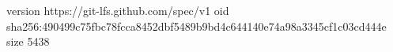 version https://git-lfs.github.com/spec/v1
oid sha256:490499c75fbc78fcca8452dbf5489b9bd4c644140e74a98a3345cf1c03cd444e
size 5438
